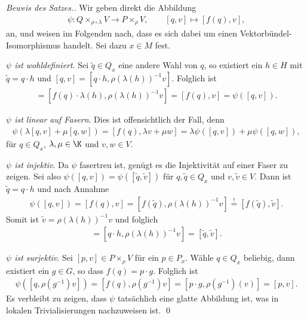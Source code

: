 \documentclass[%
	paper=a5,%
	fleqn,%
	DIV=18,%
	BCOR=0mm,
	fontsize=11pt,
	titlepage=false,%
	bibliography=totoc,
	DIV=18,%
	twoside=true,
	pdftitle=Riemannsche Geometrie,
	pdfauthor=Uwe Semmelmann,
	numbers=noendperiod]%
	{scrbook}
\begin{document}
\begin{proof}[Beweis des Satzes.]
Wir geben direkt die Abbildung
\begin{align*}
\psi: Q\times_{\rho\circ\lambda} V \to P\times_\rho V,\qquad
[q,v]\mapsto [f(q),v],
\end{align*}
an, und weisen im Folgenden nach, dass es sich dabei um einen 
Vektorbündel-Isomorphismus handelt. Sei dazu $x\in M$ fest.

\textit{$\psi$ ist wohldefiniert}. Sei $\tilde{q}\in Q_x$ eine andere Wahl von
$q$, so existiert ein $h\in H$ mit $\tilde{q} = q\cdot h$ und
$[q,v] = [q\cdot h,\rho(\lambda(h))^{-1}v]$. Folglich ist
\begin{align*}
[f(q\cdot h),\rho(\lambda(h))^{-1}v] = 
[f(q)\cdot\lambda(h),\rho(\lambda(h))^{-1}v] = [f(q),v] = \psi([q,v]).
\end{align*}

\textit{$\psi$ ist linear auf Fasern}. Dies ist offensichtlich der Fall, denn
\begin{align*}
\psi(\lambda[q,v] + \mu[q,w]) = [f(q),\lambda v + \mu w]
= \lambda\psi([q,v]) + \mu\psi([q,w]),
\end{align*}
für $q\in Q_x$, $\lambda,\mu\in \K$ und $v,w\in V$.

\textit{$\psi$ ist injektiv}. Da $\psi$ fasertreu ist, genügt es die
Injektivität auf einer Faser zu zeigen. Sei also $\psi([q,v]) =
\psi([\tilde{q},\tilde{v}])$ für $q,\tilde{q}\in Q_x$ und $v,\tilde{v}\in V$.
Dann ist $\tilde{q} = q\cdot h$ und nach Annahme
\begin{align*}
\psi([q,v]) = [f(q),v] = [f(\tilde{q}),\rho(\lambda(h))^{-1}v]
\overset{!}{=}[f(\tilde{q}),\tilde{v}].
\end{align*}
Somit ist $\tilde{v} = \rho(\lambda(h))^{-1}v$ und folglich
\begin{align*}
[q,v] = [q\cdot h,\rho(\lambda(h))^{-1}v] = [\tilde{q},\tilde{v}].
\end{align*}

\textit{$\psi$ ist surjektiv}. Sei $[p,v]\in P\times_\rho V$ für ein $p\in P_x$.
Wähle $q\in Q_x$ beliebig, dann existiert ein $g\in G$, so dass $f(q) = p\cdot
g$. Folglich ist
\begin{align*}
\psi([q,\rho(g^{-1})v]) = [f(q),\rho(g^{-1})v]
= [p\cdot g,\rho(g^{-1})(v)] = [p,v].
\end{align*}
Es verbleibt zu zeigen, dass $\psi$ tatsächlich eine glatte Abbildung ist,
was in lokalen Trivialisierungen nachzuweisen ist.
\qed
\end{proof}
\end{document}

